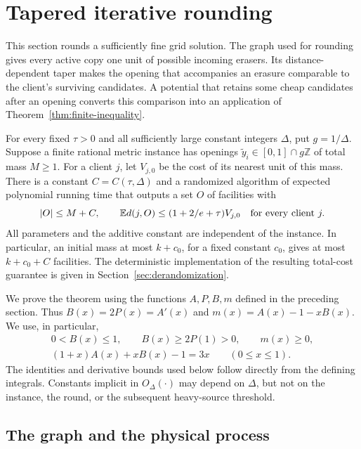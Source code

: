 \section{Tapered iterative rounding}\label{sec:rounding}

This section rounds a sufficiently fine grid solution.  The graph used for
rounding gives every active copy one unit of possible incoming erasers.
Its distance-dependent taper makes the opening that accompanies an erasure
comparable to the client's surviving candidates.  A potential that retains
some cheap candidates after an opening converts this comparison into an
application of Theorem~\ref{thm:finite-inequality}.

\begin{theorem}\label{thm:grid-rounding}
For every fixed $\tau>0$ and all sufficiently large constant integers
$\Delta$, put $g=1/\Delta$.  Suppose a finite rational metric instance has openings
$\widetilde y_i\in[0,1]\cap g\mathbb Z$ of total mass $M\ge1$.
For a client $j$, let $V_{j,0}$ be the cost of its nearest unit of this mass.
There is a constant $C=C(\tau,\Delta)$ and a randomized algorithm of
expected polynomial running time that outputs a set $O$ of facilities with
\[
 |O|\le M+C,
 \qquad
 \mathbb E d(j,O)\le(1+2/e+\tau)V_{j,0}\quad\text{for every client }j.
\]
All parameters and the additive constant are independent of the instance.
In particular, an initial mass at most $k+c_0$, for a fixed constant
$c_0$, gives at most $k+c_0+C$ facilities.
The deterministic implementation of the resulting total-cost guarantee
is given in Section~\ref{sec:derandomization}.
\end{theorem}

We prove the theorem using the functions $A,P,B,m$ defined in the preceding
section.  Thus $B(x)=2P(x)=A'(x)$ and
$m(x)=A(x)-1-xB(x)$.  We use, in particular,
\begin{equation}\label{eq:rnd-function-identities}
 \begin{gathered}
 0<B(x)\le1,\qquad B(x)\ge2P(1)>0,\qquad m(x)\ge0,\\
 (1+x)A(x)+xB(x)-1=3x\qquad(0\le x\le1).
 \end{gathered}
\end{equation}
The identities and derivative bounds used below follow directly from
the defining integrals.  Constants implicit in $O_\Delta(\cdot)$ may
depend on $\Delta$, but not on the instance, the round, or the subsequent
heavy-source threshold.

\subsection{The graph and the physical process}

